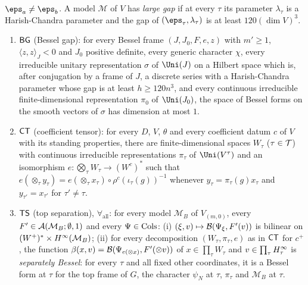 \begin{definition}
\begin{enumerate}[label=(\alph*)]
$\eps_a\ne\eps_b$. A model $\mathcal M$ of $V$ has \emph{large gap} if at every $\tau$ its parameter $\lambda_\tau$ is a
Harish-Chandra parameter and the gap of $(\eps_\tau,\lambda_\tau)$ is at least $120(\dim V)^3$.
\end{enumerate}
\end{definition}

\begin{definition}\label{pf:fs:topstatements}
\begin{enumerate}[label=(\arabic*)]
\item $\mathsf{BG}$ (Bessel gap): for every Bessel frame $(J,J_0,F,e,z)$ with $m'\ge1$, $\langle z,z\rangle_J<0$ and $J_0$ positive
definite, every generic character $\chi$, every irreducible unitary representation $\sigma$ of $\Uni(J)$ on a Hilbert space which
is, after conjugation by a frame of $J$, a discrete series with a Harish-Chandra parameter whose gap is at least
$h\ge120n^3$, and every continuous irreducible finite-dimensional representation $\pi_0$ of $\Uni(J_0)$, the space of Bessel
forms on the smooth vectors of $\sigma$ has dimension at most $1$.
\item $\mathsf{CT}$ (coefficient tensor): for every $D$, $V$, $\theta$ and every coefficient datum $c$ of $V$ with its standing
properties, there are finite-dimensional spaces $W_\tau$ ($\tau\in\mathcal T$) with continuous irreducible representations $\pi_\tau$
of $\Uni(V^\tau)$ and an isomorphism $e\colon\bigotimes_\tau W_\tau\to(W^c)^*$ such that
$e(\otimes_\tau y_\tau)=e(\otimes_\tau x_\tau)\circ\rho^c(\iota_\tau(g))^{-1}$ whenever $y_\tau=\pi_\tau(g)x_\tau$ and
$y_{\tau'}=x_{\tau'}$ for $\tau'\ne\tau$.
\item $\mathsf{TS}$ (top separation), $\forall_{\mathrm{all}}$: for every model $\mathcal M_B$ of $V_{(m,0)}$, every
$F'\in\mathcal A(\mathcal M_B;\emptyset,1)$ and every $\Psi\in\mathrm{Cols}$: (i) $(\xi,v)\mapsto\mathcal B(\Psi_\xi,F'(v))$ is bilinear on
$(W^+)^*\times H^{\infty}(\mathcal M_B)$; (ii) for every decomposition $(W_\tau,\pi_\tau,e)$ as in $\mathsf{CT}$ for $c^+$, the function
$\beta(x,v)=\mathcal B(\Psi_{e(\otimes x)},F'(\otimes v))$ of $x\in\prod_\tau W_\tau$ and $v\in\prod_\tau H^{\infty}_\tau$ is
\emph{separately Bessel}: for every $\tau$ and all fixed other coordinates, it is a Bessel form at $\tau$ for the top frame of
$G$, the character $\psi_N$ at $\tau$, $\pi_\tau$ and $\mathcal M_B$ at $\tau$.
\end{enumerate}
\end{definition}

